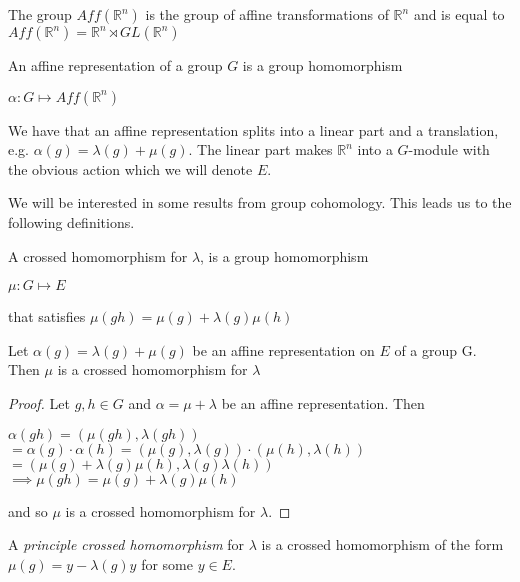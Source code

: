 The group $Aff(\mathbb{R}^n)$ is the group of affine transformations of
$\mathbb{R}^n$ and is equal to $Aff(\mathbb{R}^n) = \mathbb{R}^n \rtimes
    GL(\mathbb{R}^n )$

\begin{definition}
    An affine representation of a group $G$ is a group homomorphism
    \begin{center}
        $\alpha: G \mapsto Aff(\mathbb{R}^n)$
    \end{center}
\end{definition}

We have that an affine representation splits into a linear part and a
translation, e.g. $\alpha(g) = \lambda(g) + \mu(g)$. The linear part makes
$\mathbb{R}^n$ into a $G$-module with the obvious action which we will denote
$E$.

We will be interested in some results from group cohomology. This leads us to
the following definitions.

\begin{definition}
    A crossed homomorphism for $\lambda$, is a group homomorphism
    \begin{center}
        $\mu: G \mapsto E$
    \end{center}
    that satisfies $\mu(gh) = \mu(g) + \lambda(g)\mu(h)$
\end{definition}

\begin{prop}
    Let $\alpha(g) = \lambda(g) + \mu(g)$ be an affine representation on $E$ of a group G. Then
    $\mu$ is a crossed homomorphism for $\lambda$
\end{prop}
\begin{proof}
    Let $g,h \in G$ and $\alpha = \mu + \lambda$ be an affine representation. Then
    \begin{center}
        $\alpha(gh) = (\mu(gh), \lambda(gh))$\\
        $=\alpha(g)\cdot \alpha(h)= (\mu(g), \lambda(g)) \cdot(\mu(h), \lambda(h)) $\\
        $= (\mu(g) + \lambda(g)\mu(h), \lambda(g)\lambda(h))$\\
        $\implies \mu(gh) = \mu(g) + \lambda(g)\mu(h)$
    \end{center}
    and so $\mu$ is a crossed homomorphism for $\lambda$.
\end{proof}

\begin{definition}
    A \textit{principle crossed homomorphism} for $\lambda$ is a crossed homomorphism
    of the form $\mu(g) = y- \lambda(g)y$ for some $y \in E$.
\end{definition}


